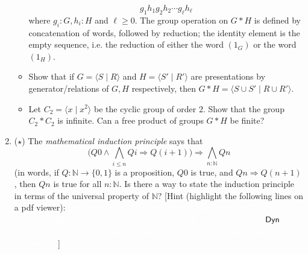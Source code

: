 \documentclass[11pt]{article}
\begin{document}
\begin{enumerate}
\begin{itemize}
		            \[g_1h_1g_2h_2\cdots g_\ell h_\ell\]
		            where \(g_i : G, h_i : H\) and \(\ell \ge 0\). The group operation on \(G*H\) is defined by concatenation of words, followed by reduction; the identity element is the empty sequence, i.e. the reduction of either the word \((1_G)\) or the word \((1_H)\).
		      \item Show that if \(G=\langle S\mid R\rangle\) and \(H=\langle S'\mid R'\rangle\) are presentations by generator/relations of \(G,H\) respectively, then \(G*H=\langle S\cup S'\mid R\cup R'\rangle\).
		      \item Let \(C_2 = \langle x\mid x^2\rangle\) be the cyclic group of order \(2\). Show that the group \(C_2 * C_2\) is infinite. Can a free product of groups \(G*H\) be finite?
	      \end{itemize}
	\item (\(\star\)) The \emph{mathematical induction principle} says that
	      \[\textstyle
		      \big(Q0\land \bigwedge_{i\le n} Qi\Rightarrow Q(i+1)\big)\Rightarrow \bigwedge_{n : \mathbb N} Qn
	      \]
	      (in words, if \(Q : \mathbb N \to \{0,1\}\) is a proposition, \(Q0\) is true, and \(Qn \Rightarrow Q(n+1)\), then \(Qn\) is true for all \(n : \mathbb N\). Is there a way to state the induction principle in terms of the universal property of \(\mathbb N\)? [Hint (highlight the following lines on a pdf viewer): \textcolor{white}{use the universal property of $\mathbb N$ to show that if $S\subseteq \mathbb N$ is a nonempty subset such that the inclusion $i : S \hookrightarrow \mathbb N$ is a morphism in $\sf Dyn$, then $S=\mathbb N$. Deduce the induction principle using a suitable $S_Q$ obtained from the property $Q$.}]
\end{enumerate}
\normalsize
\end{document}
